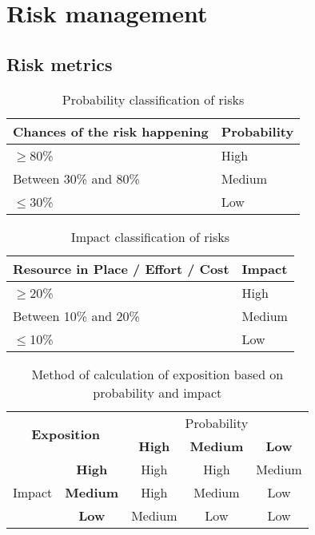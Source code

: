 \section{Risk management}

\subsection{Risk metrics}

\begin{table}[H]
	\centering
	\begin{tabular}{|l|l|}
		\hline
		\rowcolor{gray!30}
		Chances of the risk happening & Probability \\ \hline
		$\geq$80\% & \cellcolor{red!60}High\\ \hline
		Between 30\% and 80\% & \cellcolor{yellow!40}Medium\\ \hline
		$\leq$30\% & \cellcolor{green!60}Low\\ \hline
	\end{tabular}
	\caption{Probability classification of risks}
\end{table}


\begin{table}[H]
	\centering
	\begin{tabular}{|l|l|}
		\hline
		\rowcolor{gray!30}
		Resource in Place / Effort / Cost & Impact \\ \hline
		$\geq$20\% & \cellcolor{red!60}High\\ \hline
		Between 10\% and 20\% & \cellcolor{yellow!40}Medium\\ \hline
		$\leq$10\% & \cellcolor{green!60}Low\\ \hline
	\end{tabular}
	\caption{Impact classification of risks}
\end{table}


\begin{table}[H]
	\centering
	\begin{tabular}{|c|c|c|c|c|}
	\hline
		\multicolumn{2}{|c|}{\multirow{2}{*}{\large\textbf{Exposition}}} & \multicolumn{3}{c|}{Probability}\\
		\multicolumn{2}{|c|}{} & \cellcolor{gray!15}\textbf{High} & \cellcolor{gray!15}\textbf{Medium} & \cellcolor{gray!15}\textbf{Low}\\ \hline %
		\multirow{3}{*}{Impact} & \cellcolor{gray!15}\textbf{High} & \cellcolor{red!60}High & \cellcolor{red!60}High & \cellcolor{yellow!40}Medium\\
		& \cellcolor{gray!15}\textbf{Medium} & \cellcolor{red!60}High & \cellcolor{yellow!40}Medium & \cellcolor{green!60}Low\\
		& \cellcolor{gray!15}\textbf{Low} & \cellcolor{yellow!40}Medium & \cellcolor{green!60}Low & \cellcolor{green!60}Low\\ \hline
	\end{tabular}
	\caption{Method of calculation of exposition based on probability and impact}
\end{table}

